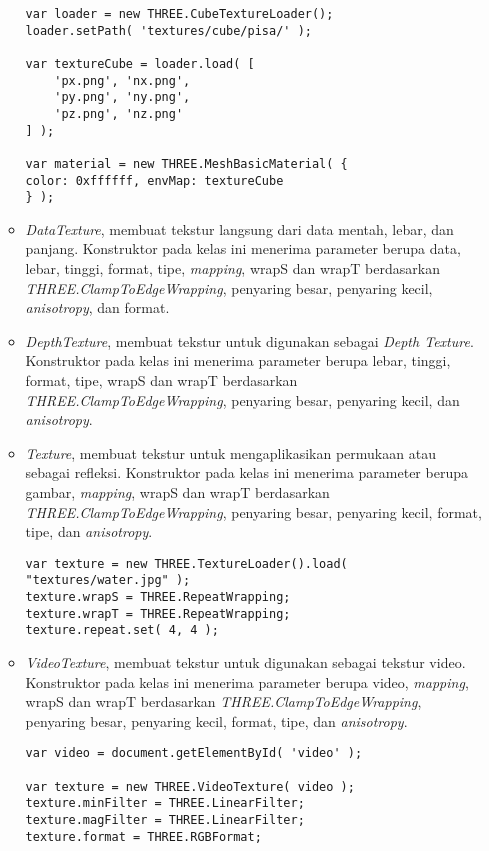 \begin{itemize}
\begin{itemize}
\begin{lstlisting}[caption={Contoh penggunaan kelas {\it CubeTexture}.},captionpos=b]
var loader = new THREE.CubeTextureLoader();
loader.setPath( 'textures/cube/pisa/' );

var textureCube = loader.load( [
	'px.png', 'nx.png',
	'py.png', 'ny.png',
	'pz.png', 'nz.png'
] );

var material = new THREE.MeshBasicMaterial( { 
color: 0xffffff, envMap: textureCube 
} );
\end{lstlisting}
	
	\item{\it DataTexture}, membuat tekstur langsung dari data mentah, lebar, dan panjang. Konstruktor pada kelas ini menerima parameter berupa data, lebar, tinggi, format, tipe, {\it mapping}, wrapS dan wrapT berdasarkan {\it THREE.ClampToEdgeWrapping}, penyaring besar, penyaring kecil, {\it anisotropy}, dan format.
	\item{\it DepthTexture}, membuat tekstur untuk digunakan sebagai {\it Depth Texture}. Konstruktor pada kelas ini menerima parameter berupa lebar, tinggi, format, tipe, wrapS dan wrapT berdasarkan {\it THREE.ClampToEdgeWrapping}, penyaring besar, penyaring kecil, dan {\it anisotropy}.
	\item {\it Texture}, membuat tekstur untuk mengaplikasikan permukaan atau sebagai refleksi. Konstruktor pada kelas ini menerima parameter berupa gambar, {\it mapping},  wrapS dan wrapT berdasarkan {\it THREE.ClampToEdgeWrapping}, penyaring besar, penyaring kecil, format, tipe, dan {\it anisotropy}.
	
\begin{lstlisting}[caption={Contoh penggunaan kelas {\it Texture}.},captionpos=b]
var texture = new THREE.TextureLoader().load( "textures/water.jpg" );
texture.wrapS = THREE.RepeatWrapping;
texture.wrapT = THREE.RepeatWrapping;
texture.repeat.set( 4, 4 );
\end{lstlisting}
	
	\item{\it VideoTexture}, membuat tekstur untuk digunakan sebagai tekstur video. Konstruktor pada kelas ini menerima parameter berupa video, {\it mapping},  wrapS dan wrapT berdasarkan {\it THREE.ClampToEdgeWrapping}, penyaring besar, penyaring kecil, format, tipe, dan {\it anisotropy}.
	
\begin{lstlisting}
var video = document.getElementById( 'video' );

var texture = new THREE.VideoTexture( video );
texture.minFilter = THREE.LinearFilter;
texture.magFilter = THREE.LinearFilter;
texture.format = THREE.RGBFormat;
\end{lstlisting}
	
	\end{itemize}	
	
\end{itemize}
 

